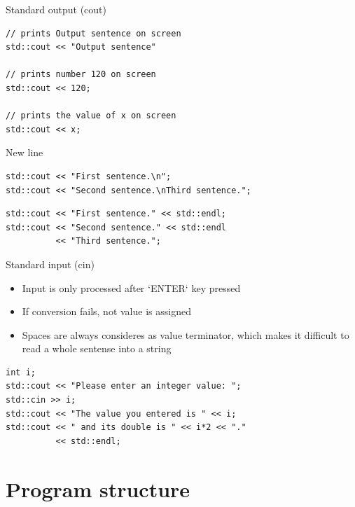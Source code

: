 \documentclass{beamer}
\begin{document}
\begin{frame}[fragile]{Standard output (cout)}
\begin{lstlisting}[caption=Standard output]
// prints Output sentence on screen
std::cout << "Output sentence" 

// prints number 120 on screen
std::cout << 120;

// prints the value of x on screen
std::cout << x;
\end{lstlisting}
\end{frame}

\begin{frame}[fragile]{New line}
\begin{lstlisting}[caption=Use ASCII newline character]
std::cout << "First sentence.\n";
std::cout << "Second sentence.\nThird sentence.";
\end{lstlisting}

\begin{lstlisting}[caption=Use portable endl]
std::cout << "First sentence." << std::endl;
std::cout << "Second sentence." << std::endl
          << "Third sentence.";
\end{lstlisting}
\end{frame}

\begin{frame}[fragile]{Standard input (cin)}
\begin{itemize}
\item Input is only processed after `ENTER` key pressed
\item If conversion fails, not value is assigned
\item Spaces are always consideres as value terminator, which makes it difficult
to read a whole sentense into a string
\end{itemize}

\begin{lstlisting}[caption=Standard input]
int i;
std::cout << "Please enter an integer value: ";
std::cin >> i;
std::cout << "The value you entered is " << i;
std::cout << " and its double is " << i*2 << "." 
          << std::endl;
\end{lstlisting}
\end{frame}


\section{Program structure}
\end{document}
